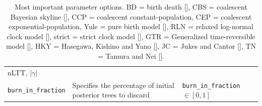\begin{table}
\begin{tabular}{|p{3.4cm}|p{9.7cm}|p{4.5cm}@{}|}
    nLTT, $|\gamma|$ \\
    \verb;burn_in_fraction; &
    Specifies the percentage of initial posterior trees to discard &
    \verb;burn_in_fraction; $\in [0, 1]$\\
    \hline
  \end{tabular}
  \caption{
    Most important parameter options.
    BD = birth death [\cite{nee1994reconstructed}], 
    CBS = coalescent Bayesian skyline [\cite{drummond2005bayesian}], 
    CCP = coalescent constant-population, 
    CEP = coalescent exponential-population,
    Yule = pure birth model [\cite{yule}],
    RLN = relaxed log-normal clock model [\cite{drummond2006relaxed}],
    strict = strict clock model [\cite{zuckerkandl1965molecules}], 
    GTR = Generalized time-reversible model [\cite{tavare1986some}], 
    HKY = Hasegawa, Kishino and Yano [\cite{hasegawa1985dating}], 
    JC = Jukes and Cantor [\cite{jukes1969evolution}], 
    TN = Tamura and Nei [\cite{tamura1993estimation}].
  }
  \label{tab:options}
\bigskip


\end{table}
